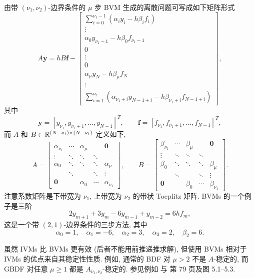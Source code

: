 由带 $(\nu_1,\nu_2)$-边界条件的 $\mu$ 步 BVM 生成的离散问题可写成如下矩阵形式
\[
  A\mathbf{y}=hB\mathbf{f}-\left[
  \begin{array}{c}
    \sum\limits_{i=0}^{\nu_1-1}(\alpha_iy_i-h\beta_if_i)\\
    \vdots\\
    \alpha_0y_{\nu_1-1}-h\beta_0f_{\nu_1-1}\\
    0\\
    \vdots\\
    0\\
    \alpha_{\mu}y_N-h\beta_{\mu}f_N\\
    \vdots\\
    \sum\limits_{i=1}^{\nu_2}(\alpha_{\nu_1+i}y_{N-1+i}-h\beta_{\nu_1+i}f_{N-1+i})
  \end{array}\right],
\]
其中
\[
  \mathbf{y}=[y_{\nu_1},y_{\nu_1+1},\ldots,y_{N-1}]^T,\qquad
  \mathbf{f}=[f_{\nu_1},f_{\nu_1+1},\ldots,f_{N-1}]^T,
\]
而 $A$ 和 $B\in\mathbb{R}^{(N-\nu_1)\times(N-\nu_1)}$ 定义如下,
\begin{equation}
  A=\begin{bmatrix}
    \alpha_{\nu_1} & \cdots & \alpha_{\mu} & & \mathbf{0}\\
    \vdots & \ddots & \ddots & \ddots & \\
    \alpha_0 & \ddots & \ddots & \ddots & \alpha_{\mu}\\
    & \ddots & & \ddots & \vdots\\
    \mathbf{0} & & \alpha_0 & \cdots & \alpha_{\nu_1}
  \end{bmatrix},\qquad
  B=\begin{bmatrix}
    \beta_{\nu_1} & \cdots & \beta_{\mu} & & \mathbf{0}\\
    \vdots & \ddots & \ddots & \ddots & \\
    \beta_0 & \ddots & \ddots & \ddots & \beta_{\mu}\\
    & \ddots & & \ddots & \vdots\\
    \mathbf{0} & & \beta_0 & \cdots & \beta_{\nu_1}
  \end{bmatrix}.
  \label{eq:9-4}
\end{equation}
注意系数矩阵是下带宽为 $\nu_1$, 上带宽为 $\nu_2$ 的带状 Toeplitz 矩阵. BVMs 的一个例子是三阶
\[
  2y_{m+1}+3y_m-6y_{m-1}+y_{m-2}=6hf_m,
\]
这是一个带 $(2,1)$-边界条件的三步方法, 其中
\[
  \alpha_0=1,\quad\alpha_1=-6,\quad\alpha_2=3,\quad\alpha_3=2,\quad\beta_2=6.
\]

虽然 IVMs 比 BVMs 更有效 (后者不能用前推递推求解), 但使用 BVMs 相对于 IVMs 的优点来自其稳定性性质. 例如, 通常的 BDF 对 $\mu>2$ 不是 $A$-稳定的, 而 GBDF 对任意 $\mu\geqslant1$ 都是 $A_{\nu_1,\nu_2}$-稳定的. 参见例如 \cite{src:1} 与 \cite{src:10} 第 79 页及图 5.1–5.3.

